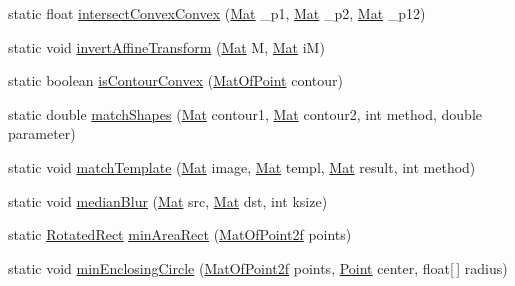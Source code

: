 \begin{DoxyCompactItemize}
\item 
static float \mbox{\hyperlink{classorg_1_1opencv_1_1imgproc_1_1_imgproc_acd39a01ff6e0be8c297243ee0d006ab9}{intersect\+Convex\+Convex}} (\mbox{\hyperlink{classorg_1_1opencv_1_1core_1_1_mat}{Mat}} \+\_\+p1, \mbox{\hyperlink{classorg_1_1opencv_1_1core_1_1_mat}{Mat}} \+\_\+p2, \mbox{\hyperlink{classorg_1_1opencv_1_1core_1_1_mat}{Mat}} \+\_\+p12)
\item 
static void \mbox{\hyperlink{classorg_1_1opencv_1_1imgproc_1_1_imgproc_aacadce25fcade314666c72930c0af3d1}{invert\+Affine\+Transform}} (\mbox{\hyperlink{classorg_1_1opencv_1_1core_1_1_mat}{Mat}} M, \mbox{\hyperlink{classorg_1_1opencv_1_1core_1_1_mat}{Mat}} iM)
\item 
static boolean \mbox{\hyperlink{classorg_1_1opencv_1_1imgproc_1_1_imgproc_a776c38eea614512469ac8192d57b5755}{is\+Contour\+Convex}} (\mbox{\hyperlink{classorg_1_1opencv_1_1core_1_1_mat_of_point}{Mat\+Of\+Point}} contour)
\item 
static double \mbox{\hyperlink{classorg_1_1opencv_1_1imgproc_1_1_imgproc_a615b8e00934e682b9f0fa511996b4434}{match\+Shapes}} (\mbox{\hyperlink{classorg_1_1opencv_1_1core_1_1_mat}{Mat}} contour1, \mbox{\hyperlink{classorg_1_1opencv_1_1core_1_1_mat}{Mat}} contour2, int method, double parameter)
\item 
static void \mbox{\hyperlink{classorg_1_1opencv_1_1imgproc_1_1_imgproc_ab7f64647bb4d0400664056af42b90063}{match\+Template}} (\mbox{\hyperlink{classorg_1_1opencv_1_1core_1_1_mat}{Mat}} image, \mbox{\hyperlink{classorg_1_1opencv_1_1core_1_1_mat}{Mat}} templ, \mbox{\hyperlink{classorg_1_1opencv_1_1core_1_1_mat}{Mat}} result, int method)
\item 
static void \mbox{\hyperlink{classorg_1_1opencv_1_1imgproc_1_1_imgproc_a94c07282afb6066b0f58ea7518f77966}{median\+Blur}} (\mbox{\hyperlink{classorg_1_1opencv_1_1core_1_1_mat}{Mat}} src, \mbox{\hyperlink{classorg_1_1opencv_1_1core_1_1_mat}{Mat}} dst, int ksize)
\item 
static \mbox{\hyperlink{classorg_1_1opencv_1_1core_1_1_rotated_rect}{Rotated\+Rect}} \mbox{\hyperlink{classorg_1_1opencv_1_1imgproc_1_1_imgproc_a36e00300ec44ed202633c9c7e466f90a}{min\+Area\+Rect}} (\mbox{\hyperlink{classorg_1_1opencv_1_1core_1_1_mat_of_point2f}{Mat\+Of\+Point2f}} points)
\item 
static void \mbox{\hyperlink{classorg_1_1opencv_1_1imgproc_1_1_imgproc_ac3ca3753976cf3f969df4b25a3f5ef78}{min\+Enclosing\+Circle}} (\mbox{\hyperlink{classorg_1_1opencv_1_1core_1_1_mat_of_point2f}{Mat\+Of\+Point2f}} points, \mbox{\hyperlink{classorg_1_1opencv_1_1core_1_1_point}{Point}} center, float\mbox{[}$\,$\mbox{]} radius)

\end{DoxyCompactItemize}
